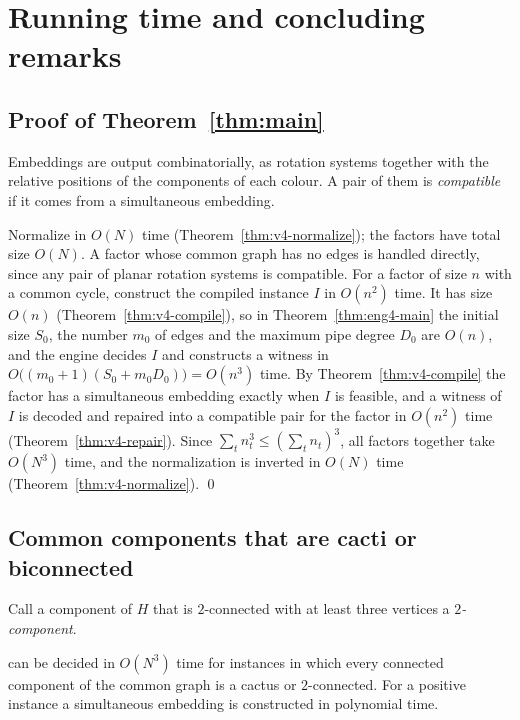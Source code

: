 \section{Running time and concluding remarks}\label{sec:v4i-conclusion}

\subsection{Proof of Theorem~\ref{thm:main}}
Embeddings are output combinatorially, as rotation systems together with
the relative positions of the components of each colour. A pair of them is
\emph{compatible} if it comes from a simultaneous embedding.

Normalize in $O(N)$ time (Theorem~\ref{thm:v4-normalize}); the factors have
total size $O(N)$. A factor whose common graph has no edges is handled
directly, since any pair of planar rotation systems is compatible. For a
factor of size $n$ with a common cycle, construct the compiled instance $I$
in $O(n^2)$ time. It has size $O(n)$ (Theorem~\ref{thm:v4-compile}), so in
Theorem~\ref{thm:eng4-main} the initial size $S_0$, the number $m_0$ of
edges and the maximum pipe degree $D_0$ are $O(n)$, and the engine decides
$I$ and constructs a witness in $O\bigl((m_0+1)(S_0+m_0D_0)\bigr)=O(n^3)$
time. By Theorem~\ref{thm:v4-compile} the factor has a simultaneous
embedding exactly when $I$ is feasible, and a witness of $I$ is decoded and
repaired into a compatible pair for the factor in $O(n^2)$ time
(Theorem~\ref{thm:v4-repair}). Since $\sum_t n_t^3\le(\sum_t n_t)^3$, all
factors together take $O(N^3)$ time, and the normalization is inverted in
$O(N)$ time (Theorem~\ref{thm:v4-normalize}). \qed

\subsection{Common components that are cacti or biconnected}
Call a component of $H$ that is $2$-connected with at least three vertices a
\emph{$2$-component}.

\begin{corollary}\label{cor:v4i-mixed}
\sefe{} can be decided in $O(N^3)$ time for instances in which every
connected component of the common graph is a cactus or $2$-connected. For a
positive instance a simultaneous embedding is constructed in polynomial
time.
\end{corollary}

